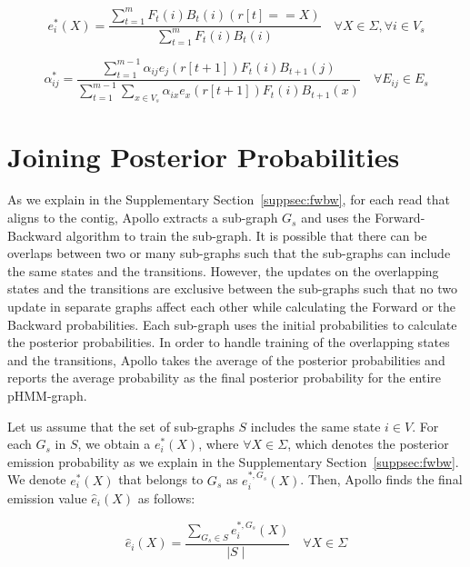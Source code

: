 \documentclass[a4paper]{article}
\begin{document}
\begin{equation}
e^{*}_i(X) = \dfrac{\sum\limits_{t=1}^m F_{t}(i)B_t(i)(r[t] == X)}
             {\sum\limits_{t=1}^m F_{t}(i)B_t(i)} \quad \forall X \in \Sigma, \forall i \in V_{s} \tag{S4} \label{suppeq:emissionupd}
\end{equation}

\begin{equation}
\alpha^{*}_{ij} = \dfrac{\sum\limits_{t=1}^{m-1} \alpha_{ij}e_{j}(r[t+1])F_{t}(i)B_{t+1}(j)}
     {\sum\limits_{t=1}^{m-1}\sum\limits_{x \in V_{s}} \alpha_{ix}e_{x}(r[t+1])F_{t}(i)B_{t+1}(x)} \quad \forall E_{ij} \in E_{s}
\tag{S5} \label{suppeq:transitionupd} 
\end{equation}

\section{Joining Posterior Probabilities}\label{suppsec:join}
As we explain in the Supplementary Section~\ref{suppsec:fwbw}, for each read that aligns to the contig, Apollo extracts a sub-graph $G_s$ and uses the Forward-Backward algorithm to train the sub-graph. It is possible that there can be overlaps between two or many sub-graphs such that the sub-graphs can include the same states and the transitions. However, the updates on the overlapping states and the transitions are exclusive between the sub-graphs such that no two update in separate graphs affect each other while calculating the Forward or the Backward probabilities. Each sub-graph uses the initial probabilities to calculate the posterior probabilities. In order to handle training of the overlapping states and the transitions, Apollo takes the average of the posterior probabilities and reports the average probability as the final posterior probability for the entire pHMM-graph.

Let us assume that the set of sub-graphs $S$ includes the same state $i \in V$. For each $G_{s}$ in $S$, we obtain a $e^{*}_i(X)$, where $\forall X \in \Sigma$, which denotes the posterior emission probability as we explain in the Supplementary Section~\ref{suppsec:fwbw}. We denote $e^*_i(X)$ that belongs to $G_{s}$ as $e^{*,G_{s}}_i(X)$. Then, Apollo finds the final emission value $\hat{e}_i(X)$ as follows: 

\begin{equation}
\hat{e}_i(X) = \dfrac{\sum\limits_{G_{s} \in S} e^{*,G_{s}}_{i}(X)}{\mid S \mid} \quad \forall X \in \Sigma
\tag{S6}\label{suppeq:emissioncapupd}
\end{equation}
\end{document}
